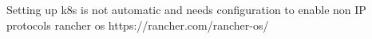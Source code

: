 Setting up k8s is not automatic and needs configuration to enable non IP protocols
rancher os
https://rancher.com/rancher-os/